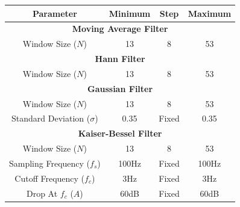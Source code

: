         \begin{center}
            \label{tbl_filtering}
            \begin{tabular}{|c|c|c|c|}
                \hline
                Parameter & Minimum & Step & Maximum \\
                \hline
                \multicolumn{4}{|c|}{\textbf{Moving Average Filter}} \\
                \hline
                Window Size ($N$) & 13 & 8 & 53 \\
                \hline
                \multicolumn{4}{|c|}{\textbf{Hann Filter}} \\
                \hline
                Window Size ($N$) & 13 & 8 & 53 \\
                \hline
                \multicolumn{4}{|c|}{\textbf{Gaussian Filter}} \\
                \hline
                Window Size ($N$) & 13 & 8 & 53 \\
                Standard Deviation ($\sigma$) & 0.35 & Fixed & 0.35 \\
                \hline
                \multicolumn{4}{|c|}{\textbf{Kaiser-Bessel Filter}} \\
                \hline
                Window Size ($N$) & 13 & 8 & 53 \\
                Sampling Frequency ($f_s$) & 100Hz & Fixed & 100Hz \\
                Cutoff Frequency ($f_c$) & 3Hz & Fixed & 3Hz \\
                Drop At $f_c$ ($A$) & 60dB & Fixed & 60dB \\
                \hline
            \end{tabular}
        \end{center}

